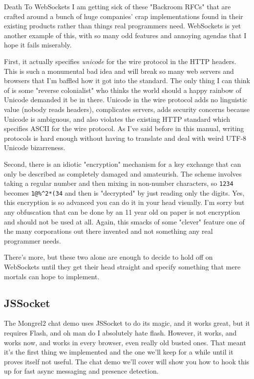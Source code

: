 \begin{aside}{Death To WebSockets}
I am getting sick of these "Backroom RFCs" that are crafted around a bunch of huge
companies' crap implementations found in their existing products rather than things
real programmers need.  WebSockets is yet another example of this, with so many odd
features and annoying agendas that I hope it fails miserably.

First, it actually specifies \emph{unicode} for the wire protocol in the HTTP headers.
This is such a monumental bad idea and will break so many web servers and browsers that
I'm baffled how it got into the standard.  The only thing I can think of is some "reverse colonialist"
who thinks the world should a happy rainbow of Unicode demanded it be in there.  Unicode in
the wire protocol adds no linguistic value (nobody reads headers), complicates servers,
adds security concerns because Unicode is ambiguous, and also violates the existing HTTP standard
which specifies ASCII for the wire protocol.  As I've said before in this manual, writing
protocols is hard enough without having to translate and deal with weird UTF-8 Unicode bizarreness.

Second, there is an idiotic "encryption" mechanism for a key exchange that can only be
described as completely damaged and amateurish.  The scheme involves taking a regular 
number and then mixing in non-number characters, so \verb|1234| becomes \verb|1@%^2*(34| and then is
"decrypted" by just reading only the digits.  Yes, this encryption is so advanced you can do it
in your head visually.  I'm sorry but any obfuscation that can be done by an 11 year old on
paper is not encryption and should not be used at all.  Again, this smacks of some "clever" feature
one of the many corporations out there invented and not something any real programmer needs.

There's more, but these two alone are enough to decide to hold off on WebSockets until
they get their head straight and specify something that mere mortals can hope to implement.
\end{aside}

\subsection{JSSocket}

The Mongrel2 chat demo uses JSSocket to do its magic, and it works great, but it requires
Flash, and oh man do I absolutely hate flash.  However, it works, and works now, and works in every
browser, even really old busted ones.  That meant it's the first thing we implemented and 
the one we'll keep for a while until it proves itself not useful.  The chat demo we'll
cover will show you how to hook this up for fast async messaging and presence detection.


